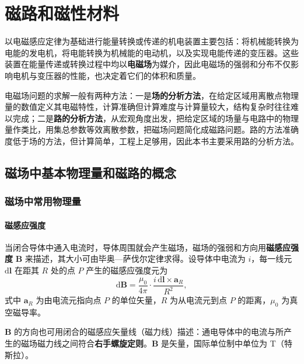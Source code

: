\chapter{磁路和磁性材料}

以电磁感应定律为基础进行能量转换或传递的机电装置主要包括：将机械能转换为电能的发电机，将电能转换为机械能的电动机，以及实现电能传递的变压器。这些装置在能量传递或转换过程中均以\textbf{电磁场}为媒介，因此电磁场的强弱和分布不仅影响电机与变压器的性能，也决定着它们的体积和质量。

电磁场问题的求解一般有两种方法：一是\textbf{场的分析方法}，在给定区域用离散点物理量的数值定义其电磁特性，计算准确但计算难度与计算量较大，结构复杂时往往难以完成；二是\textbf{路的分析方法}，从宏观角度出发，把给定区域的场量与电路中的物理量作类比，用集总参数等效离散参数，把磁场问题简化成磁路问题。路的方法准确度低于场的方法，但计算简单，工程上足够用，因此本书主要采用路的分析方法。

\section{磁场中基本物理量和磁路的概念}

\subsection{磁场中常用物理量}

\subsubsection{磁感应强度}
当闭合导体中通入电流时，导体周围就会产生磁场，磁场的强弱和方向用\textbf{磁感应强度} $\boldsymbol{B}$ 来描述，其大小可由毕奥—萨伐尔定律求得。设导体中电流为 $i$，每一线元 $\mathrm{d}\boldsymbol{l}$ 在距其 $R$ 处的点 $P$ 产生的磁感应强度元为
\begin{equation}
\mathrm{d}\boldsymbol{B}=\frac{\mu_0}{4\pi}\cdot\frac{i\,\mathrm{d}\boldsymbol{l}\times \boldsymbol{a}_R}{R^{2}},
\end{equation}
式中 $\boldsymbol{a}_R$ 为由电流元指向点 $P$ 的单位矢量，$R$ 为从电流元到点 $P$ 的距离，$\mu_0$ 为真空磁导率。

$\boldsymbol{B}$ 的方向也可用闭合的磁感应矢量线（磁力线）描述：通电导体中的电流与所产生的磁场磁力线之间符合\textbf{右手螺旋定则}。$\boldsymbol{B}$ 是矢量，国际单位制中单位为 T（特斯拉）。

